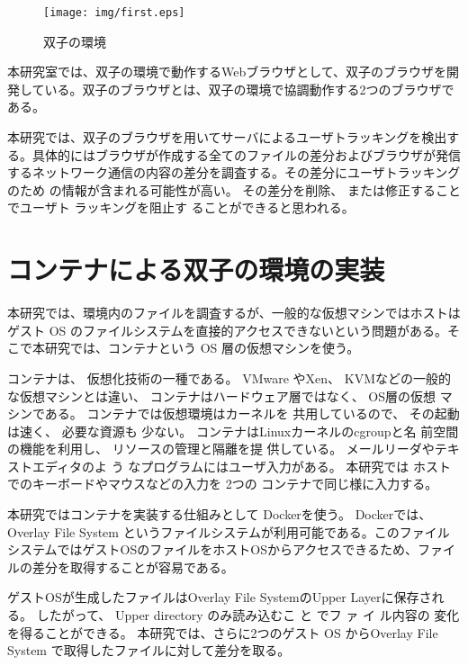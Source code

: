 \documentclass[a4paper,twocolumn,10pt]{jarticle}
\begin{document}
\begin{figure}[t]
\begin{center}
\texttt{[image: img/first.eps]}
\vspace*{-10mm}\caption{双子の環境}
\label{figure:twin}
\end{center}
\end{figure}



本研究室では、双子の環境で動作するWebブラウザとして、双子のブラウザを開発している\cite{comsys}。双子のブラウザとは、双子の環境で協調動作する2つのブラウザである。

本研究では、双子のブラウザを用いてサーバによるユーザトラッキングを検出する。具体的にはブラウザが作成する全てのファイルの差分およびブラウザが発信するネットワーク通信の内容の差分を調査する。その差分にユーザトラッキングのため の情報が含まれる可能性が高い。 その差分を削除、 または修正することでユーザト ラッキングを阻止す ることができると思われる。




\section{コンテナによる双子の環境の実装}
本研究では、環境内のファイルを調査するが、一般的な仮想マシンではホストはゲスト OS のファイルシステムを直接的アクセスできないという問題がある。そこで本研究では、コンテナという OS 層の仮想マシンを使う。

コンテナは、 仮想化技術の一種である。 VMware やXen、 KVMなどの一般的な仮想マシンとは違い、 コンテナはハードウェア層ではなく、 OS層の仮想 マシンである。 コンテナでは仮想環境はカーネルを 共用しているので、 その起動は速く、 必要な資源も 少ない。 コンテナはLinuxカーネルのcgroupと名 前空間の機能を利用し、 リソースの管理と隔離を提 供している。 メールリーダやテキストエディタのよ う なプログラムにはユーザ入力がある。 本研究では ホストでのキーボードやマウスなどの入力を 2つの コンテナで同じ様に入力する。


本研究ではコンテナを実装する仕組みとして Dockerを使う。 Dockerでは、 Overlay File System というファイルシステムが利用可能である。このファイルシステムではゲストOSのファイルをホストOSからアクセスできるため、ファイルの差分を取得することが容易である。

ゲストOSが生成したファイルはOverlay File SystemのUpper Layerに保存される。 したがって、 Upper directory のみ読み込むこ と でフ ァ イ ル内容の 変化を得ることができる。 本研究では、さらに2つのゲスト OS からOverlay File System で取得したファイルに対して差分を取る。
\end{document}
